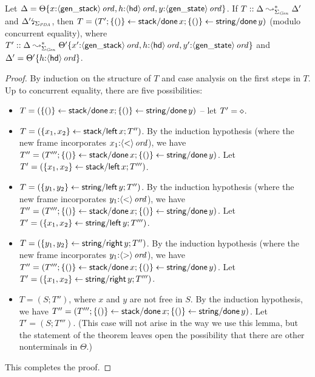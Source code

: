 \bigskip
\begin{lemma}
  Let $\Delta = {\Theta}\{{x{:}{\langle {\sf gen\_stack} \rangle}\,{{\it ord}},
    h{:}{\langle {\sf hd} \rangle}\,{{\it ord}}, y{:}{\langle {\sf gen\_state} \rangle}\,{{\it ord}}}\}$.
  If $T :: \Delta \leadsto^*_{\Sigma_{\it Gen}} \Delta'$ and
  ${\Delta'}{\mbox{\lightning}}_{\Sigma_{\it PDA}}$, then $T = (T';
  \{{()}\} \leftarrow {{\sf stack/done}\,x}; \{{()}\} \leftarrow {{\sf
      string/done}\,y})$ (modulo concurrent equality), where $T' ::
  \Delta \leadsto^*_{\Sigma_{\it Gen}}
  {\Theta'}\{{x'{:}{\langle {\sf gen\_stack} \rangle}\,{{\it ord}},
    h{:}{\langle {\sf hd} \rangle}\,{{\it ord}}, y'{:}{\langle {\sf gen\_state} \rangle}\,{{\it ord}}}\}$
  and $\Delta' = {\Theta'}\{{h{:}{\langle {\sf hd} \rangle}\,{{\it ord}}}\}$.
\end{lemma}
\begin{proof}
By induction on the structure of $T$ and case analysis on the first
steps in $T$. Up to concurrent equality, there are five possibilities:
\begin{itemize}
\item $T = (\{{()}\} \leftarrow {{\sf stack/done}\,x}; \{{()}\} \leftarrow {{\sf
      string/done}\,y})$ -- let $T' = \diamond$.
\item $T = (\{{x_1,x_2}\} \leftarrow {{\sf stack/left}\,x}; T'')$. By the
  induction hypothesis (where the new frame incorporates
  $x_1{:}{\langle {\sf <} \rangle}\,{{\it ord}}$), we have $T'' = (T''';
  \{{()}\} \leftarrow {{\sf stack/done}\,x}; \{{()}\} \leftarrow {{\sf
      string/done}\,y})$. Let $T' = (\{{x_1,x_2}\} \leftarrow {{\sf
      stack/left}\,x}; T''')$.
\item $T = (\{{y_1,y_2}\} \leftarrow {{\sf string/left}\,y}; T'')$. By the
  induction hypothesis (where the new frame incorporates
  $y_1{:}{\langle {\sf <} \rangle}\,{{\it ord}}$), we have $T'' = (T''';
  \{{()}\} \leftarrow {{\sf stack/done}\,x}; \{{()}\} \leftarrow {{\sf
      string/done}\,y})$. Let $T' = (\{{x_1,x_2}\} \leftarrow {{\sf
      string/left}\,y}; T''')$.
\item $T = (\{{y_1,y_2}\} \leftarrow {{\sf string/right}\,y}; T'')$. By the
  induction hypothesis (where the new frame incorporates
  $y_1{:}{\langle {\sf >} \rangle}\,{{\it ord}}$), we have $T'' = (T''';
  \{{()}\} \leftarrow {{\sf stack/done}\,x}; \{{()}\} \leftarrow {{\sf
      string/done}\,y})$. Let $T' = (\{{x_1,x_2}\} \leftarrow {{\sf
      string/right}\,y}; T''')$.
\item $T = (S; T'')$, where $x$ and $y$ are not free in $S$. 
      By the induction hypothesis, we have
      $T'' = (T''';
       \{{()}\} \leftarrow {{\sf stack/done}\,x}; \{{()}\} \leftarrow {{\sf
       string/done}\,y})$. Let $T' = (S; T''')$. (This case will not arise
      in the way we use this lemma, but the statement of the theorem 
      leaves open the possibility that there are other nonterminals
      in $\Theta$.)
\end{itemize}
This completes the proof. 
\end{proof}

